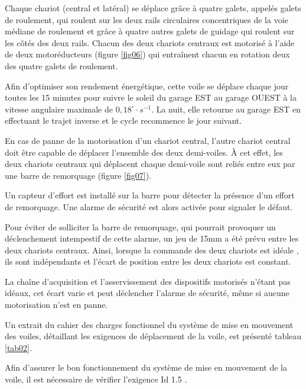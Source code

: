 
Chaque chariot (central et latéral) se déplace grâce à quatre galets, appelés galets de roulement, qui roulent sur les deux rails circulaires concentriques de la voie médiane de roulement et grâce à quatre autres galets de guidage qui roulent sur les côtés des deux rails. Chacun des deux chariots centraux est motorisé à l'aide de deux motoréducteurs (figure \ref{fig06}) qui entraînent chacun en rotation deux des quatre galets de roulement.


Afin d'optimiser son rendement énergétique, cette voile se déplace chaque jour toutes les 15 minutes pour suivre le soleil du garage EST au garage OUEST à la vitesse angulaire maximale de $0,18^{\circ}\cdot s^{-1}$. La nuit, elle retourne au garage EST en effectuant le trajet inverse et le cycle recommence le jour suivant. 

En cas de panne de la motorisation d'un chariot central, l'autre chariot central doit être capable de déplacer l'ensemble des deux demi-voiles. À cet effet, les deux chariots centraux qui déplacent chaque demi-voile sont reliés entre eux par une barre de remorquage (figure \ref{fig07}).

Un capteur d'effort est installé sur la barre pour détecter la présence d'un effort de remorquage. Une alarme de sécurité est alors activée pour signaler le défaut.

Pour éviter de solliciter la barre de remorquage, qui pourrait provoquer un déclenchement intempestif de cette alarme, un jeu de 15mm a été prévu entre les deux chariots centraux. Ainsi, lorsque la commande des deux chariots est \og idéale \fg, ils sont indépendants et l'écart de position entre les deux chariots est constant.

La chaîne d'acquisition et l'asservissement des dispositifs motorisés n'étant pas idéaux, cet écart varie et peut déclencher l'alarme de sécurité, même si aucune motorisation n'est en panne.

Un extrait du cahier des charges fonctionnel du système de mise en mouvement des voiles, détaillant les exigences de déplacement de la voile, est présenté tableau \ref{tab02}.

Afin d'assurer le bon fonctionnement du système de mise en mouvement de la voile, il est nécessaire de vérifier l'exigence \og Id 1.5 \fg.

